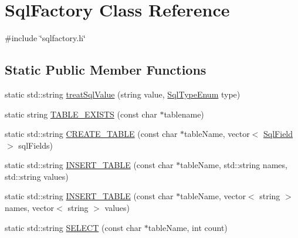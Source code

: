 \hypertarget{classSqlFactory}{}\section{Sql\+Factory Class Reference}
\label{classSqlFactory}


{\ttfamily \#include \char`\"{}sqlfactory.\+h\char`\"{}}

\subsection*{Static Public Member Functions}
\begin{DoxyCompactItemize}
\item 
static std\+::string \mbox{\hyperlink{classSqlFactory_a46f4bbef3a8868e711ac6a832cc4fee3}{treat\+Sql\+Value}} (string value, \mbox{\hyperlink{datadefinition_8h_ad06ef517a8bb3398f146f81f18988b9f}{Sql\+Type\+Enum}} type)
\item 
static string \mbox{\hyperlink{classSqlFactory_a3dcc73772b677e2e739e7130c9886615}{T\+A\+B\+L\+E\+\_\+\+E\+X\+I\+S\+TS}} (const char $\ast$tablename)
\item 
static std\+::string \mbox{\hyperlink{classSqlFactory_a0500a06f7e113a0921eec11e2d39ce80}{C\+R\+E\+A\+T\+E\+\_\+\+T\+A\+B\+LE}} (const char $\ast$table\+Name, vector$<$ \mbox{\hyperlink{structSqlField}{Sql\+Field}} $>$ sql\+Fields)
\item 
static std\+::string \mbox{\hyperlink{classSqlFactory_a9819d8d4683d97617ec2a9dcd5c462a4}{I\+N\+S\+E\+R\+T\+\_\+\+T\+A\+B\+LE}} (const char $\ast$table\+Name, std\+::string names, std\+::string values)
\item 
static std\+::string \mbox{\hyperlink{classSqlFactory_aa3bf3f1cf57e9980d740809a249db516}{I\+N\+S\+E\+R\+T\+\_\+\+T\+A\+B\+LE}} (const char $\ast$table\+Name, vector$<$ string $>$ names, vector$<$ string $>$ values)
\item 
static std\+::string \mbox{\hyperlink{classSqlFactory_a40368c3142309ffaec984147fd6ebad5}{S\+E\+L\+E\+CT}} (const char $\ast$table\+Name, int count)
\end{DoxyCompactItemize}
